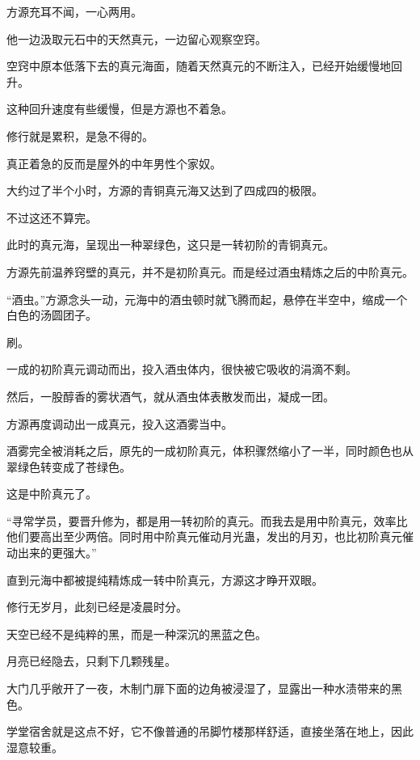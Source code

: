 
\begin{this_body}



方源充耳不闻，一心两用。

他一边汲取元石中的天然真元，一边留心观察空窍。

空窍中原本低落下去的真元海面，随着天然真元的不断注入，已经开始缓慢地回升。

这种回升速度有些缓慢，但是方源也不着急。

修行就是累积，是急不得的。

真正着急的反而是屋外的中年男性个家奴。

大约过了半个小时，方源的青铜真元海又达到了四成四的极限。

不过这还不算完。

此时的真元海，呈现出一种翠绿色，这只是一转初阶的青铜真元。

方源先前温养窍壁的真元，并不是初阶真元。而是经过酒虫精炼之后的中阶真元。

“酒虫。”方源念头一动，元海中的酒虫顿时就飞腾而起，悬停在半空中，缩成一个白色的汤圆团子。

刷。

一成的初阶真元调动而出，投入酒虫体内，很快被它吸收的涓滴不剩。

然后，一股醇香的雾状酒气，就从酒虫体表散发而出，凝成一团。

方源再度调动出一成真元，投入这酒雾当中。

酒雾完全被消耗之后，原先的一成初阶真元，体积骤然缩小了一半，同时颜色也从翠绿色转变成了苍绿色。

这是中阶真元了。

“寻常学员，要晋升修为，都是用一转初阶的真元。而我去是用中阶真元，效率比他们要高出至少两倍。同时用中阶真元催动月光蛊，发出的月刃，也比初阶真元催动出来的更强大。”

直到元海中都被提纯精炼成一转中阶真元，方源这才睁开双眼。

修行无岁月，此刻已经是凌晨时分。

天空已经不是纯粹的黑，而是一种深沉的黑蓝之色。

月亮已经隐去，只剩下几颗残星。

大门几乎敞开了一夜，木制门扉下面的边角被浸湿了，显露出一种水渍带来的黑色。

学堂宿舍就是这点不好，它不像普通的吊脚竹楼那样舒适，直接坐落在地上，因此湿意较重。


\end{this_body}
